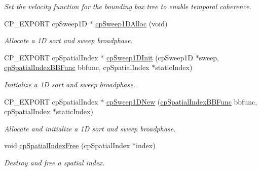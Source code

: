 \begin{DoxyCompactItemize}
\begin{DoxyCompactList}\small\item\em Set the velocity function for the bounding box tree to enable temporal coherence. \end{DoxyCompactList}\item 
\mbox{\label{group__cpSpatialIndex_ga5b593ed2f68cdf440a0d64400958a66b}} 
C\+P\+\_\+\+E\+X\+P\+O\+RT cp\+Sweep1D $\ast$ \hyperlink{group__cpSpatialIndex_ga5b593ed2f68cdf440a0d64400958a66b}{cp\+Sweep1\+D\+Alloc} (void)
\begin{DoxyCompactList}\small\item\em Allocate a 1D sort and sweep broadphase. \end{DoxyCompactList}\item 
\mbox{\label{group__cpSpatialIndex_ga6cde136ab726cb8f64e6aa6fcf39ef8d}} 
C\+P\+\_\+\+E\+X\+P\+O\+RT cp\+Spatial\+Index $\ast$ \hyperlink{group__cpSpatialIndex_ga6cde136ab726cb8f64e6aa6fcf39ef8d}{cp\+Sweep1\+D\+Init} (cp\+Sweep1D $\ast$sweep, \hyperlink{group__cpSpatialIndex_gaa8cf991cadcee1fbb6ee9379a0a6e0ea}{cp\+Spatial\+Index\+B\+B\+Func} bbfunc, cp\+Spatial\+Index $\ast$static\+Index)
\begin{DoxyCompactList}\small\item\em Initialize a 1D sort and sweep broadphase. \end{DoxyCompactList}\item 
\mbox{\label{group__cpSpatialIndex_ga423c0a804374f7dc31a1680b791240c1}} 
C\+P\+\_\+\+E\+X\+P\+O\+RT cp\+Spatial\+Index $\ast$ \hyperlink{group__cpSpatialIndex_ga423c0a804374f7dc31a1680b791240c1}{cp\+Sweep1\+D\+New} (\hyperlink{group__cpSpatialIndex_gaa8cf991cadcee1fbb6ee9379a0a6e0ea}{cp\+Spatial\+Index\+B\+B\+Func} bbfunc, cp\+Spatial\+Index $\ast$static\+Index)
\begin{DoxyCompactList}\small\item\em Allocate and initialize a 1D sort and sweep broadphase. \end{DoxyCompactList}\item 
\mbox{\label{group__cpSpatialIndex_ga13a62ecd13b6dbee7d4c8ae056e0f86f}} 
void \hyperlink{group__cpSpatialIndex_ga13a62ecd13b6dbee7d4c8ae056e0f86f}{cp\+Spatial\+Index\+Free} (cp\+Spatial\+Index $\ast$index)
\begin{DoxyCompactList}\small\item\em Destroy and free a spatial index. \end{DoxyCompactList}\item 

\end{DoxyCompactItemize}
